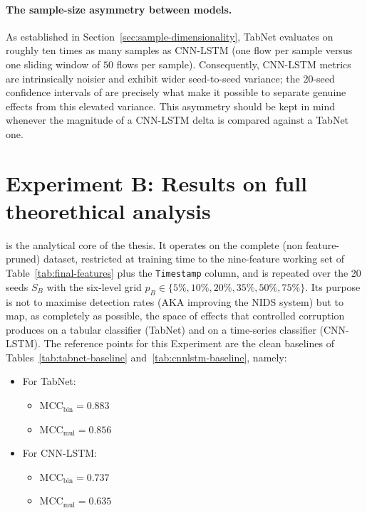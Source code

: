 \documentclass[../main.tex]{subfiles}
\begin{document}
\paragraph{The sample-size asymmetry between models.}
As established in Section~\ref{sec:sample-dimensionality}, TabNet evaluates on roughly ten times as many samples as CNN-LSTM (one flow per sample versus one sliding window of $50$ flows per sample). Consequently, CNN-LSTM metrics are intrinsically noisier and exhibit wider seed-to-seed variance; the 20-seed confidence intervals of  are precisely what make it possible to separate genuine effects from this elevated variance. This asymmetry should be kept in mind whenever the magnitude of a CNN-LSTM delta is compared against a TabNet one.

\newpage
\section{Experiment B: Results on full theorethical analysis}
\label{sec:res-B}

 is the analytical core of the thesis. It operates on the complete (non feature-pruned) dataset, restricted at training time to the nine-feature working set of Table~\ref{tab:final-features} plus the \texttt{Timestamp} column, and is repeated over the 20 seeds $S_B$ with the six-level grid $p_B \in \{5\%, 10\%, 20\%, 35\%, 50\%, 75\%\}$. Its purpose is not to maximise detection rates (AKA improving the NIDS system) but to map, as completely as possible, the space of effects that controlled corruption produces on a tabular classifier (TabNet) and on a time-series classifier (CNN-LSTM). 
The reference points for this Experiment are the clean baselines of Tables~\ref{tab:tabnet-baseline} and~\ref{tab:cnnlstm-baseline}, namely:
\begin{itemize}
    \item For TabNet:
    \begin{itemize}
        \item  $\mathrm{MCC}_{\text{bin}} = 0.883$
        \item  $\mathrm{MCC}_{\text{mul}} = 0.856$
    \end{itemize} 
    \item For CNN-LSTM:
    \begin{itemize}
        \item  $\mathrm{MCC}_{\text{bin}} = 0.737$
        \item  $\mathrm{MCC}_{\text{mul}} = 0.635$
    \end{itemize} 
\end{itemize}
\end{document}
